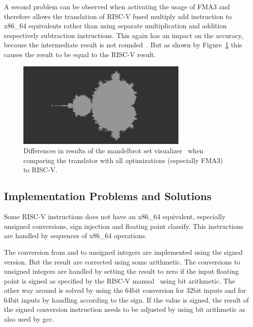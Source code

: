 \documentclass[course=eragp]{aspdoc}
\begin{document}
\par

A second problem can be observed when activating the usage of FMA3 and therefore allows the
translation of RISC-V fused multiply add instruction to x86\_64 equivalents rather than using
separate multiplication and addition respectively subtraction instructions. This again has an impact
on the accuracy, because the intermediate result is not rounded~\cite{intel2017man}. But as shown by
Figure~\ref{fig:mandelbrot_diff_fma3} this causes the result to be equal to the RISC-V result.

\par

\begin{figure}[ht]
    \centering
    \includegraphics[width=0.75\textwidth]{images/mandelbrot_differences/fma_diff.png}
    \caption{Differences in results of the mandelbrot set visualizer~\cite{mandelbrot_program} when
        comparing the translator with all optimizations (especially FMA3) to RISC-V.}\label{fig:mandelbrot_diff_fma3}
\end{figure}

\subsection{Implementation Problems and Solutions}

Some RISC-V instructions does not have an x86\_64 equivalent, especially unsigned conversions, sign
injection and floating point classify. This instructions are handled by sequences of x86\_64
operations.

\par

The conversion from and to unsigned integers are implemented using the signed version. But the
result are corrected using some arithmetic. The conversions to unsigned integers are handled by
setting the result to zero if the input floating point is signed as specified by the RISC-V
manual~\cite{rvspec} using bit arithmetic. The other way around is solved by using the 64bit
conversion for 32bit inputs and for 64bit inputs by handling according to the sign. If the value is
signed, the result of the signed conversion instruction needs to be adjusted by using bit arithmetic
as also used by gcc.
\end{document}
